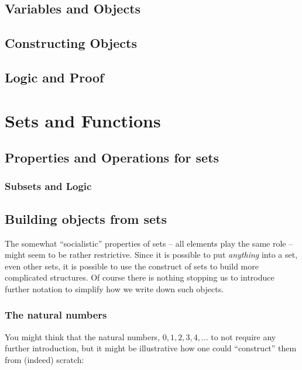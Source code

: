 \section{Variables and Objects}

\section{Constructing Objects}

\section{Logic and Proof}

\chapter{Sets and Functions}

\section{Properties and Operations for sets}

\subsection{Subsets and Logic}

\section{Building objects from sets}
\label{secmultiset}

The somewhat ``socialistic'' properties of sets -- all elements play the
same role -- might seem to be rather restrictive. Since it is possible to
put {\em anything} into a set, even other sets, it is possible to use the
construct of sets to build more complicated structures. Of course there is
nothing stopping us to introduce further notation to simplify how we write
down such objects.

\subsection{The natural numbers}

\bonussection
You might think
that the natural numbers, $0,1,2,3,4,\ldots$ to not require any further
introduction, but it might be illustrative how one could ``construct'' them
from (indeed) scratch:

